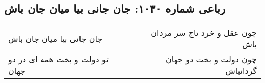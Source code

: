 \begin{center}
\section*{رباعی شماره ۱۰۳۰: جان جانی بیا میان جان باش}
\label{sec:1030}
\begin{longtable}{l p{0.5cm} r}
جان جانی بیا میان جان باش
&&
چون عقل و خرد تاج سر مردان باش
\\
تو دولت و بخت همه ای در دو جهان
&&
چون دولت و بخت دو جهان گردانباش
\\
\end{longtable}
\end{center}
